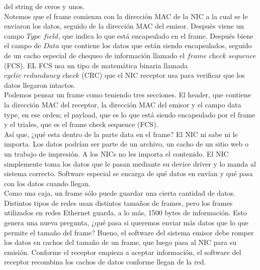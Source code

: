 \documentclass[12pt]{report}
\begin{document}
del string de ceros y unos.\\
Notemos que el frame comienza con la dirección MAC de la NIC a la cual se 
le enviaron los datos, seguido de la dirección MAC del emisor. Despuès 
viene un campo $\textit{Type field}$, que indica lo que está encapsulado 
en el frame. Después biene el campo de $\textit{Data}$ que contiene los datos
que están siendo encapsulados, seguido de un cacho especial de chequeo de información
llamado el $\textit{frame check sequence}$ (FCS). EL FCS usa un tipo de 
matemática binaria llamada $\textit{cyclic redundancy check}$ (CRC) que el NIC
receptor usa para verificar que los datos llegaron intactos.\\
Podemos pensar un frame como teniendo tres secciones. El header, 
que contiene la dirección MAC del receptor, la dirección MAC del emisor y el 
campo data type, en ese orden; el payload, que es lo que está siendo encapsulado 
por el frame y el triales, que es el frame check sequence (FCS).\\
Así que, ¿qué esta dentro de la parte data en el frame? El NIC ni sabe ni le importa.
Los datos podrían ser parte de un archivo, un cacho de un sitio web o un
trabajo de impresión. A los NICs no les importa el contenido. El NIC
simplemente toma los datos que le pasan mediante su device driver y lo manda 
al sistema correcto. Software especial se encarga de qué datos en envían y
qué pasa con los datos cuando llegan.\\
Como una caja, un frame sólo puede guardar una cierta cantidad de datos. 
Distintos tipos de redes usan distintos tamaños de frames, pero los frames utilizados
en redes Ethernet guarda, a lo más, 1500 bytes de información.
Esto genera una nueva pregunta, ¿qué pasa si queremos enviar más datos
que lo que permite el tamaño del frame? Bueno, el software del sistema emisor
debe romper los datos en cachos del tamaño de un frame, que luego pasa al NIC
para su emisión. Conforme el receptor empieza a aceptar información, el software
del receptor recombina los cachos de datos conforme llegan de la red.
\end{document}
